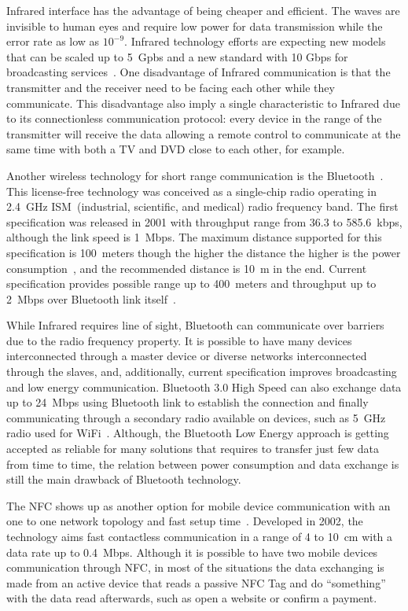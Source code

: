 Infrared interface has the advantage of being cheaper and efficient.
The waves are invisible to human eyes and require low power for data transmission while the error rate as low as $10^{-9}$.
Infrared technology efforts are expecting new models that can be scaled up to 5~Gpbs and a new standard with 10 Gbps for broadcasting services~\citep{Deicke201optical}.
One disadvantage of Infrared communication is that the transmitter and the receiver need to be facing each other while they communicate.
This disadvantage also imply a single characteristic to Infrared due to its connectionless communication protocol: every device in the range of the transmitter will receive the data allowing a remote control to communicate at the same time with both a TV and DVD close to each other, for example.

Another wireless technology for short range communication is the Bluetooth~\citep{Bhagwat2001bluetooth}.
This license-free technology was conceived as a single-chip radio operating in 2.4~GHz ISM~(industrial, scientific, and medical) radio frequency band.
The first specification was released in 2001 with throughput range from 36.3 to 585.6~kbps, although the link speed is 1~Mbps.
The maximum distance supported for this specification is 100~meters though the higher the distance the higher is the power consumption~\citep[p.~20]{Gupta2013insidebluetooth}, and the recommended distance is 10~m in the end.
Current specification provides possible range up to 400~meters and throughput up to 2~Mbps over Bluetooth link itself~\citep{Bluetooth2016bluetooth}.

While Infrared requires line of sight, Bluetooth can communicate over barriers due to the radio frequency property.
It is possible to have many devices interconnected through a master device or diverse networks interconnected through the slaves, and, additionally, current specification improves broadcasting and low energy communication.
Bluetooth 3.0 High Speed can also exchange data up to 24~Mbps using Bluetooth link to establish the connection and finally communicating through a secondary radio available on devices, such as 5~GHz radio used for WiFi~\citep{Bluetooth2009bluetooth}.
Although, the Bluetooth Low Energy approach is getting accepted as reliable for many solutions that requires to transfer just few data from time to time, the relation between power consumption and data exchange is still the main drawback of Bluetooth technology.

The NFC shows up as another option for mobile device communication with an one to one network topology and fast setup time~\citep{Coskun2013nfc}.
Developed in 2002, the technology aims fast contactless communication in a range of 4 to 10~cm with a data rate up to 0.4~Mbps.
Although it is possible to have two mobile devices communication through NFC, in most of the situations the data exchanging is made from an active device that reads a passive NFC Tag and do ``something'' with the data read afterwards, such as open a website or confirm a payment.

